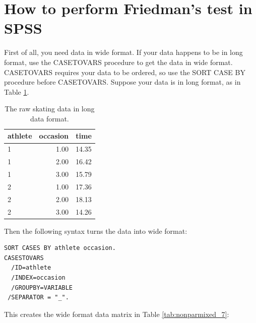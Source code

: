 \documentclass[]{report}\usepackage[]{graphicx}\usepackage[]{color}
\begin{document}
\section{How to perform Friedman's test in SPSS}

First of all, you need data in wide format. If your data happens to be in long format, use the CASETOVARS procedure to get the data in wide format. CASETOVARS requires your data to be ordered, so use the SORT CASE BY procedure before CASETOVARS. Suppose your data is in long format, as in Table \ref{tab:nonparmixed_6}.

\begin{table}[ht]
\centering
\caption{The raw skating data in long data format.} 
\label{tab:nonparmixed_6}
\begin{tabular}{lrr}
  \hline
athlete & occasion & time \\ 
  \hline
1 & 1.00 & 14.35 \\ 
  1 & 2.00 & 16.42 \\ 
  1 & 3.00 & 15.79 \\ 
  2 & 1.00 & 17.36 \\ 
  2 & 2.00 & 18.13 \\ 
  2 & 3.00 & 14.26 \\ 
   \hline
\end{tabular}
\end{table}



Then the following syntax turns the data into wide format:


\begin{verbatim}
SORT CASES BY athlete occasion.
CASESTOVARS
  /ID=athlete
  /INDEX=occasion
  /GROUPBY=VARIABLE
 /SEPARATOR = "_".
\end{verbatim}


This creates the wide format data matrix in Table \ref{tab:nonparmixed_7}:
\end{document}
